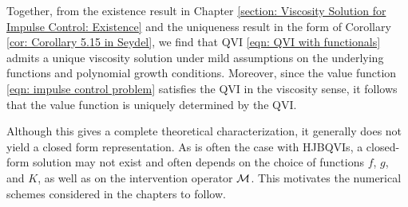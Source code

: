 Together, from the existence result in Chapter \ref{section: Viscosity Solution for Impulse Control: Existence} and the uniqueness result in the form of Corollary \ref{cor: Corollary 5.15 in Seydel}, we find that QVI \eqref{eqn: QVI with functionals} admits a unique viscosity solution under mild assumptions on the underlying functions and polynomial growth conditions. Moreover, since the value function \eqref{eqn: impulse control problem} satisfies the QVI in the viscosity sense, it follows that the value function is uniquely determined by the QVI. 

Although this gives a complete theoretical characterization, it generally does not yield a closed form representation. As is often the case with HJBQVIs, a closed-form solution may not exist and often depends on the choice of functions $f$, $g$, and $K$, as well as on the intervention operator $\mathcal{M}$. This motivates the numerical schemes considered in the chapters to follow.